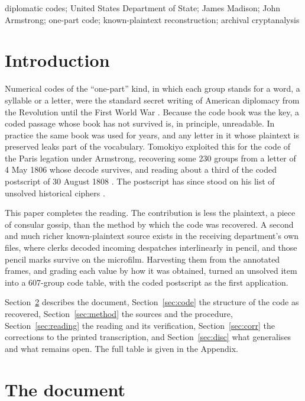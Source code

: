 \documentclass[]{interact}
\begin{document}
\begin{keywords}
diplomatic codes; United States Department of State; James Madison; John Armstrong; one-part code; known-plaintext reconstruction; archival cryptanalysis
\end{keywords}

\section{Introduction}

Numerical codes of the ``one-part'' kind, in which each group stands for a word, a syllable or a letter, were the standard secret writing of American diplomacy from the Revolution until the First World War \citep{Weber:1979}. Because the code book was the key, a coded passage whose book has not survived is, in principle, unreadable. In practice the same book was used for years, and any letter in it whose plaintext is preserved leaks part of the vocabulary. Tomokiyo exploited this for the code of the Paris legation under Armstrong, recovering some 230 groups from a letter of 4 May 1806 whose decode survives, and reading about a third of the coded postscript of 30 August 1808 \citep{Tomokiyo:armstrong}. The postscript has since stood on his list of unsolved historical ciphers \citep{Tomokiyo:unsolved}.

This paper completes the reading. The contribution is less the plaintext, a piece of consular gossip, than the method by which the code was recovered. A second and much richer known-plaintext source exists in the receiving department's own files, where clerks decoded incoming despatches interlinearly in pencil, and those pencil marks survive on the microfilm. Harvesting them from the annotated frames, and grading each value by how it was obtained, turned an unsolved item into a 607-group code table, with the coded postscript as the first application.

Section~\ref{sec:doc} describes the document, Section~\ref{sec:code} the structure of the code as recovered, Section~\ref{sec:method} the sources and the procedure, Section~\ref{sec:reading} the reading and its verification, Section~\ref{sec:corr} the corrections to the printed transcription, and Section~\ref{sec:disc} what generalises and what remains open. The full table is given in the Appendix.

\section{The document}\label{sec:doc}
\end{document}
